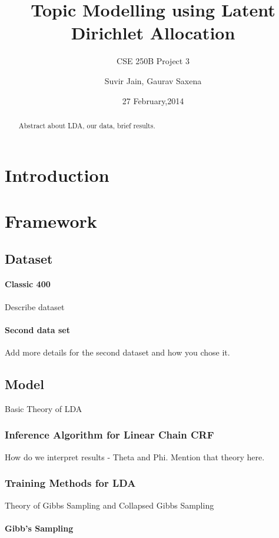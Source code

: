 \documentclass[11pt,a4paper,oneside]{article}
\title{Topic Modelling using Latent Dirichlet Allocation}
\subtitle{CSE 250B Project 3}
\author{Suvir Jain, Gaurav Saxena}
\date{27 February,2014}
\begin{document}
\maketitle

\begin{abstract}
Abstract about LDA, our data, brief results.
\end{abstract}

\section{Introduction}

\section{Framework}
\label{sec:Framework}

\subsection{Dataset}

\paragraph{Classic 400}
Describe dataset

\paragraph{Second data set}
Add more details for the second dataset and how you chose it.

\subsection{Model}
Basic Theory of LDA

\subsubsection{Inference Algorithm for Linear Chain CRF}
How do we interpret results - Theta and Phi.
Mention that theory here.

\subsubsection{Training Methods for LDA}

Theory of Gibbs Sampling and Collapsed Gibbs Sampling

\paragraph*{Gibb's Sampling}
\end{document}
